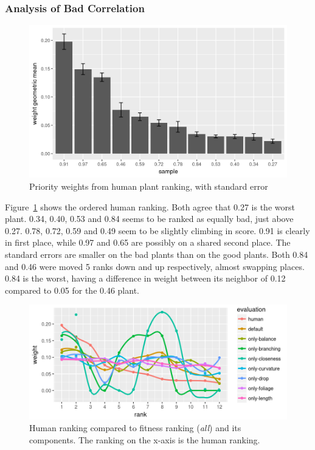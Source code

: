 
\subsubsection{Analysis of Bad Correlation}
\begin{figure}
    \centering
    \includegraphics[width=1.0\textwidth]{figures/weights_bar}
    \caption[Priority weights from human plant ranking]{Priority weights from human plant ranking, with standard error}
    \label{fig:weights-bar}
\end{figure}

Figure~\ref{fig:weights-bar} shows the ordered human ranking.
Both agree that 0.27 is the worst plant.
0.34, 0.40, 0.53 and 0.84 seems to be ranked as equally bad, just above 0.27.
0.78, 0.72, 0.59 and 0.49 seem to be slightly climbing in score.
0.91 is clearly in first place, while 0.97 and 0.65 are possibly on a shared second place.
The standard errors are smaller on the bad plants than on the good plants.
Both 0.84 and 0.46 were moved 5 ranks down and up respectively, almost swapping places.
0.84 is the worst, having a difference in weight between its neighbor of 0.12 compared to 0.05 for the 0.46 plant.

\begin{figure}
    \centering
    \includegraphics[width=1.0\textwidth]{figures/fitcmp-only}
    \caption[Human ranking compared to fitness ranking and its components]{Human ranking compared to fitness ranking (\textit{all}) and its components. The ranking on the x-axis is the human ranking.}
    \label{fig:fitcmp-only}
\end{figure}

